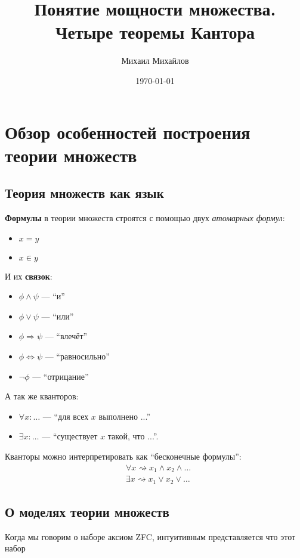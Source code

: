 \documentclass{article}
\title{Понятие мощности множества. Четыре теоремы Кантора}
\author{Михаил Михайлов}
\date{\today}
\begin{document}
\maketitle
\tableofcontents
\newpage

\section{Обзор особенностей построения теории множеств}
\subsection{Теория множеств как язык}
\textbf{Формулы} в теории множеств строятся с помощью двух \textit{атомарных формул}:
\begin{itemize}
    \item \(x = y\)
    \item \(x \in y\)
\end{itemize}
И их \textbf{связок}:
\begin{itemize}
    \item \(\phi \land \psi\) --- \enquote{и}
    \item \(\phi \lor \psi\) --- \enquote{или}
    \item \(\phi \Rightarrow \psi\) --- \enquote{влечёт}
    \item \(\phi \Leftrightarrow \psi\) --- \enquote{равносильно}
    \item \(\neg\phi\) --- \enquote{отрицание}
\end{itemize}
А так же кванторов:
\begin{itemize}
    \item \(\forall x: \ldots\) --- \enquote{для всех $x$ выполнено ...}
    \item \(\exists x: \ldots\) --- \enquote{существует $x$ такой, что ...}.
\end{itemize}
\begin{remark}
    \label{rem:quantifier-relations-basic-operations}
    Кванторы можно интерпретировать как \enquote{бесконечные формулы}:
    \begin{align*}
        &\forall x \rightsquigarrow x_1 \land x_2 \land \ldots \\
        &\exists x \rightsquigarrow x_1 \lor  x_2 \lor  \ldots
    \end{align*}
\end{remark}

\subsection{О моделях теории множеств}
Когда мы говорим о наборе аксиом ZFC, интуитивным представляется что этот набор 
\end{document}

